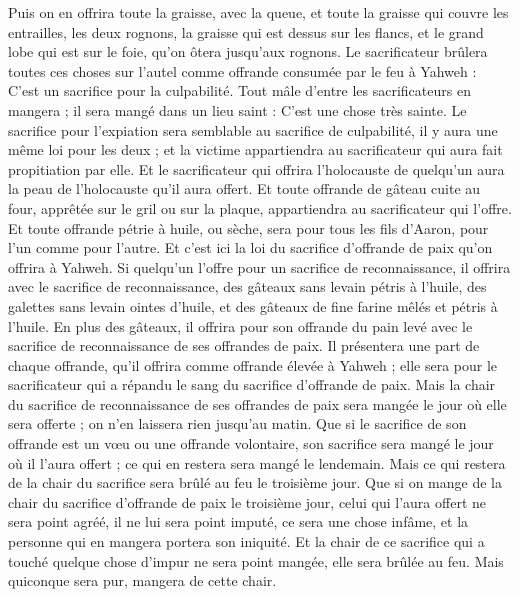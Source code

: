 \begin{multicols}{2}
Puis on en offrira toute la graisse, avec la queue, et toute la graisse qui couvre les entrailles,
les deux rognons, la graisse qui est dessus sur les flancs, et le grand lobe qui est sur le foie, qu'on ôtera jusqu'aux rognons.
Le sacrificateur brûlera toutes ces choses sur l'autel comme offrande consumée par le feu à Yahweh : C'est un sacrifice pour la culpabilité.
Tout mâle d'entre les sacrificateurs en mangera ; il sera mangé dans un lieu saint : C'est une chose très sainte.
Le sacrifice pour l'expiation sera semblable au sacrifice de culpabilité, il y aura une même loi pour les deux ; et la victime appartiendra au sacrificateur qui aura fait propitiation par elle.
Et le sacrificateur qui offrira l'holocauste de quelqu'un aura la peau de l'holocauste qu'il aura offert.
Et toute offrande de gâteau cuite au four, apprêtée sur le gril ou sur la plaque, appartiendra au sacrificateur qui l'offre.
Et toute offrande pétrie à huile, ou sèche, sera pour tous les fils d'Aaron, pour l'un comme pour l'autre.
Et c'est ici la loi du sacrifice d'offrande de paix qu'on offrira à Yahweh.
Si quelqu'un l'offre pour un sacrifice de reconnaissance, il offrira avec le sacrifice de reconnaissance, des gâteaux sans levain pétris à l'huile, des galettes sans levain ointes d'huile, et des gâteaux de fine farine mêlés et pétris à l'huile.
En plus des gâteaux, il offrira pour son offrande du pain levé avec le sacrifice de reconnaissance de ses offrandes de paix.
Il présentera une part de chaque offrande, qu'il offrira comme offrande élevée à Yahweh ; elle sera pour le sacrificateur qui a répandu le sang du sacrifice d'offrande de paix.
Mais la chair du sacrifice de reconnaissance de ses offrandes de paix sera mangée le jour où elle sera offerte ; on n'en laissera rien jusqu'au matin.
Que si le sacrifice de son offrande est un vœu ou une offrande volontaire, son sacrifice sera mangé le jour où il l'aura offert ; ce qui en restera sera mangé le lendemain.
Mais ce qui restera de la chair du sacrifice sera brûlé au feu le troisième jour.
Que si on mange de la chair du sacrifice d'offrande de paix le troisième jour, celui qui l'aura offert ne sera point agréé, il ne lui sera point imputé, ce sera une chose infâme, et la personne qui en mangera portera son iniquité.
Et la chair de ce sacrifice qui a touché quelque chose d'impur ne sera point mangée, elle sera brûlée au feu. Mais quiconque sera pur, mangera de cette chair.

\end{multicols}
